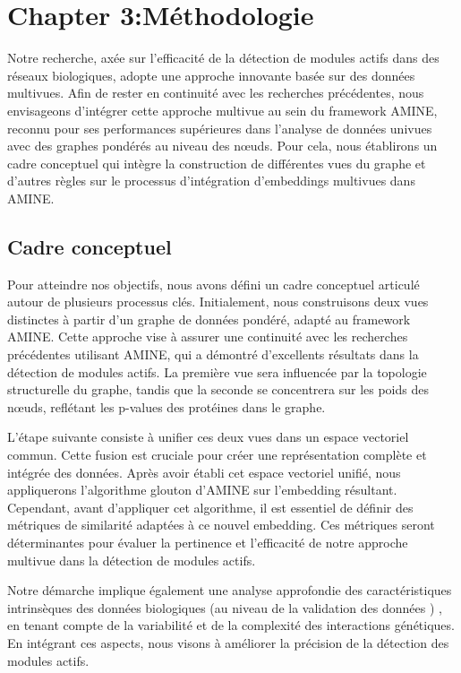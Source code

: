 \chapter{Chapter 3:Méthodologie}

Notre recherche, axée sur l’efficacité de la détection de modules actifs dans des réseaux biologiques, adopte une approche innovante basée sur des données multivues. Afin de rester en continuité avec les recherches précédentes, nous envisageons d'intégrer cette approche multivue au sein du framework AMINE, reconnu pour ses performances supérieures dans l'analyse de données univues avec des graphes pondérés au niveau des nœuds. Pour cela, nous établirons un cadre conceptuel qui intègre la construction de différentes vues du graphe et d'autres règles sur le processus d'intégration d'embeddings multivues dans AMINE.

\section{Cadre conceptuel}

Pour atteindre nos objectifs, nous avons défini un cadre conceptuel articulé autour de plusieurs processus clés. Initialement, nous construisons deux vues distinctes à partir d'un graphe de données pondéré, adapté au framework AMINE. Cette approche vise à assurer une continuité avec les recherches précédentes utilisant AMINE, qui a démontré d'excellents résultats dans la détection de modules actifs. La première vue sera influencée par la topologie structurelle du graphe, tandis que la seconde se concentrera sur les poids des nœuds, reflétant les p-values des protéines dans le graphe.

L'étape suivante consiste à unifier ces deux vues dans un espace vectoriel commun. Cette fusion est cruciale pour créer une représentation complète et intégrée des données. Après avoir établi cet espace vectoriel unifié, nous appliquerons l'algorithme glouton d'AMINE sur l'embedding résultant. Cependant, avant d'appliquer cet algorithme, il est essentiel de définir des métriques de similarité adaptées à ce nouvel embedding. Ces métriques seront déterminantes pour évaluer la pertinence et l'efficacité de notre approche multivue dans la détection de modules actifs.

Notre démarche implique également une analyse approfondie des caractéristiques intrinsèques des données biologiques (au niveau de la validation des données ) , en tenant compte de la variabilité et de la complexité des interactions génétiques. En intégrant ces aspects, nous visons à améliorer la précision de la détection des modules actifs.


